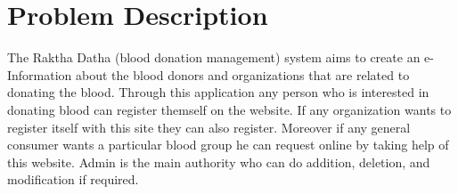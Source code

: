 \section{Problem Description}

\vspace{5mm} %

The Raktha Datha (blood donation management) system aims to create an e-Information about the blood donors and organizations
that are related to donating the blood.
Through this application any person who is interested in donating blood can register themself on the website.
If any organization wants to register itself with this site they can also register.
Moreover if any general consumer wants a particular blood group he can request online by taking help of this website.
Admin is the main authority who can do addition, deletion, and modification if required.

